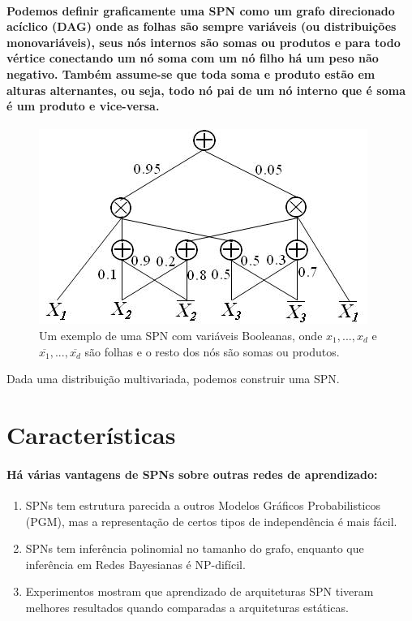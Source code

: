 \documentclass[a4paper,10pt]{article}
\theoremstyle{plain}
\begin{document}
\paragraph{
  Podemos definir graficamente uma SPN como um grafo direcionado acíclico (DAG) onde as 
folhas são sempre variáveis (ou distribuições monovariáveis), seus nós internos são somas ou 
produtos e para todo vértice conectando um nó soma com um nó filho há um peso não negativo. 
Também assume-se que toda soma e produto estão em alturas alternantes, ou seja, todo nó pai 
de um nó interno que é soma é um produto e vice-versa.
}

\begin{figure}[h]
\centering\includegraphics[scale=0.7]{imgs/domingos_poon.jpg}
\caption{Um exemplo de uma SPN com variáveis Booleanas, onde $x_1,...,x_d$ e 
  $\overline{x_1},...,\overline{x_d}$ são folhas e o resto dos nós são somas ou produtos.\cite{poon-domingos}}
\end{figure}

Dada uma distribuição multivariada, podemos construir uma SPN. 

\section{Características}

\paragraph{
  Há várias vantagens de SPNs sobre outras redes de aprendizado:
}

\begin{enumerate} \itemsep0pt
  \item SPNs tem estrutura parecida a outros Modelos Gráficos Probabilisticos (PGM), mas a 
    representação de certos tipos de independência é mais fácil.
  \item SPNs tem inferência polinomial no tamanho do grafo, enquanto que inferência em Redes Bayesianas
    é NP-difícil.
  \item Experimentos mostram que aprendizado de arquiteturas SPN tiveram melhores resultados quando
    comparadas a arquiteturas estáticas.\cite{clustering}
\end{enumerate}
\end{document}
